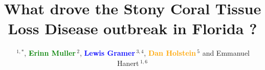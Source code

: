 \documentclass[utf8]{frontiersSCNS}
\newcommand{\erinn}[1]{\textbf{\textcolor{green}{#1}}}
\newcommand{\lew}[1]{\textbf{\textcolor{blue}{#1}}}
\newcommand{\dan}[1]{\textbf{\textcolor{orange}{#1}}}
\newcommand{\dobby}[1]{\textbf{\color{violet}{#1}}}
\def\firstAuthorLast{Dobbelaere {et~al.}} %
\def\Authors{\dobby{Thomas Dobbelaere}\,$^{1,*}$, \erinn{Erinn Muller}\,$^{2}$, \lew{Lewis Gramer}\,$^{3,4}$, \dan{Dan Holstein}\,$^{5}$  and Emmanuel Hanert\,$^{1,6}$}
\begin{document}
\onecolumn
{}

\title[What drove the SCTLD outbreak in Florida]{What drove the Stony Coral Tissue Loss Disease outbreak in Florida ?}

\author[\firstAuthorLast ]{\Authors} %
\address{} %
\correspondance{} %
\extraAuth{}

\maketitle
\end{document}
